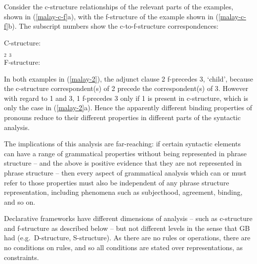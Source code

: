 \documentclass[output=paper,hidelinks]{langscibook}
\begin{document}
Consider the c-structure relationships of the relevant
parts of the examples, shown in (\ref{malay-c-f}a), with the f-structure of
the example shown in (\ref{malay-c-f}b). The subscript numbers show the
c-to-f-structure correspondences:

\ea\label{malay-c-f}
\ea C-structure:\\
\hspace{50pt}$_2$\hspace{50pt}
$_3$\\[-0.1em]
\ex
F-structure:\\[.5em]
{%
}\z\z

In both examples in (\ref{malay-2}), the adjunct clause 2 f-precedes
3, `child', because the c-structure correspondent(s) of 2 precede the
correspondent(s) of 3. However with regard to 1 and 3, 1 f-precedes 3
only if 1 is present in c-structure, which is only the case in
(\ref{malay-2}a). Hence the apparently different binding properties of
pronouns reduce to their different properties in different parts of
the syntactic analysis.

The implications of this analysis are far-reaching: if certain
syntactic elements can have a range of grammatical properties without
being represented in phrase structure -- and the above is positive
evidence that they are not represented in phrase structure -- then
every aspect of grammatical analysis which can or must refer to those
properties must also be independent of any phrase structure
representation, including phenomena such as subjecthood, agreement,
binding, and so on.

Declarative frameworks have different dimensions of analysis -- such
as c-structure and f-structure as described below -- but not different
levels in the sense that GB had (e.g.~D-structure, S-structure). As
there are no rules or operations, there are no conditions on rules,
and so all conditions are stated over representations, as constraints.
\end{document}
